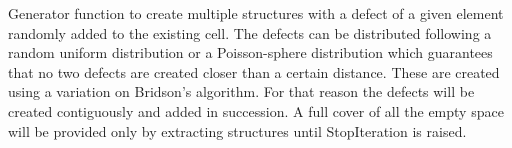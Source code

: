 \documentclass[letterpaper,10pt,english]{sphinxmanual}
\begin{document}
\begin{fulllineitems}
\label{doctree/soprano.collection.generate.defect:soprano.collection.generate.defect.defectGen}
Generator function to create multiple structures with a defect of a
given element randomly added to the existing cell. The defects can be
distributed following a random uniform distribution or a Poisson-sphere
distribution which guarantees that no two defects are created closer than
a certain distance. These are created using a variation on Bridson's
algorithm. For that reason the defects will be created contiguously and
added in succession. A full cover of all the empty space will be provided
only by extracting structures until StopIteration is raised.


\end{fulllineitems}
\end{document}
